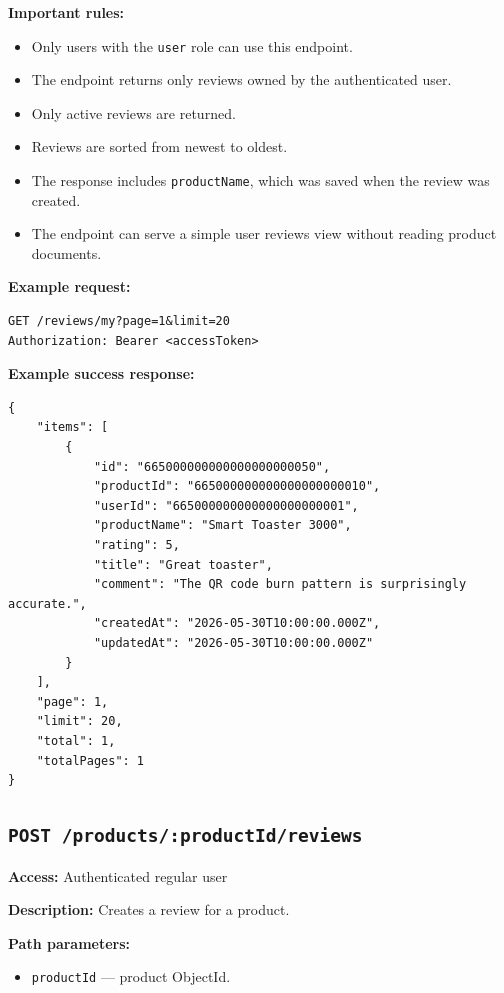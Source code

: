 \textbf{Important rules:}

\begin{itemize}
    \item Only users with the \texttt{user} role can use this endpoint.
    \item The endpoint returns only reviews owned by the authenticated user.
    \item Only active reviews are returned.
    \item Reviews are sorted from newest to oldest.
    \item The response includes \texttt{productName}, which was saved when the review was created.
    \item The endpoint can serve a simple user reviews view without reading product documents.
\end{itemize}

\textbf{Example request:}

\begin{verbatim}
GET /reviews/my?page=1&limit=20
Authorization: Bearer <accessToken>
\end{verbatim}

\textbf{Example success response:}

\begin{verbatim}
{
    "items": [
        {
            "id": "665000000000000000000050",
            "productId": "665000000000000000000010",
            "userId": "665000000000000000000001",
            "productName": "Smart Toaster 3000",
            "rating": 5,
            "title": "Great toaster",
            "comment": "The QR code burn pattern is surprisingly accurate.",
            "createdAt": "2026-05-30T10:00:00.000Z",
            "updatedAt": "2026-05-30T10:00:00.000Z"
        }
    ],
    "page": 1,
    "limit": 20,
    "total": 1,
    "totalPages": 1
}
\end{verbatim}

\subsection{\texttt{POST /products/:productId/reviews}}

\textbf{Access:} Authenticated regular user

\textbf{Description:} Creates a review for a product.

\textbf{Path parameters:}

\begin{itemize}
    \item \texttt{productId} --- product ObjectId.
\end{itemize}

